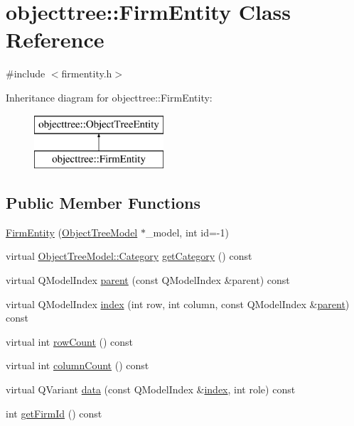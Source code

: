 \hypertarget{classobjecttree_1_1_firm_entity}{}\section{objecttree\+::Firm\+Entity Class Reference}
\label{classobjecttree_1_1_firm_entity}


{\ttfamily \#include $<$firmentity.\+h$>$}

Inheritance diagram for objecttree\+::Firm\+Entity\+:\begin{figure}[H]
\begin{center}
\leavevmode
\includegraphics[height=2.000000cm]{d2/dd4/classobjecttree_1_1_firm_entity}
\end{center}
\end{figure}
\subsection*{Public Member Functions}
\begin{DoxyCompactItemize}
\item 
\mbox{\hyperlink{classobjecttree_1_1_firm_entity_a24d42d2b14b36ded0c98df1feff267a0}{Firm\+Entity}} (\mbox{\hyperlink{class_object_tree_model}{Object\+Tree\+Model}} $\ast$\+\_\+model, int id=-\/1)
\item 
virtual \mbox{\hyperlink{class_object_tree_model_a379e9d6b0d381853785adf62095ba4e3}{Object\+Tree\+Model\+::\+Category}} \mbox{\hyperlink{classobjecttree_1_1_firm_entity_afb530ac7e5dd4c94421c0db1b21ae54e}{get\+Category}} () const
\item 
virtual Q\+Model\+Index \mbox{\hyperlink{classobjecttree_1_1_firm_entity_ab5b9b04771a497f2967d2507148ed0d8}{parent}} (const Q\+Model\+Index \&parent) const
\item 
virtual Q\+Model\+Index \mbox{\hyperlink{classobjecttree_1_1_firm_entity_a8df24819f408a5e5935e62123b4c91f0}{index}} (int row, int column, const Q\+Model\+Index \&\mbox{\hyperlink{classobjecttree_1_1_firm_entity_ab5b9b04771a497f2967d2507148ed0d8}{parent}}) const
\item 
virtual int \mbox{\hyperlink{classobjecttree_1_1_firm_entity_a54710c1de98b77d104881459adfb5e3a}{row\+Count}} () const
\item 
virtual int \mbox{\hyperlink{classobjecttree_1_1_firm_entity_a814fda01c51f85c1a7f420245a573927}{column\+Count}} () const
\item 
virtual Q\+Variant \mbox{\hyperlink{classobjecttree_1_1_firm_entity_a002cd38e68797084065eec0872150270}{data}} (const Q\+Model\+Index \&\mbox{\hyperlink{classobjecttree_1_1_firm_entity_a8df24819f408a5e5935e62123b4c91f0}{index}}, int role) const
\item 
int \mbox{\hyperlink{classobjecttree_1_1_firm_entity_a963db72ceeb3c14522b8cce26ecae4c4}{get\+Firm\+Id}} () const
\end{DoxyCompactItemize}
